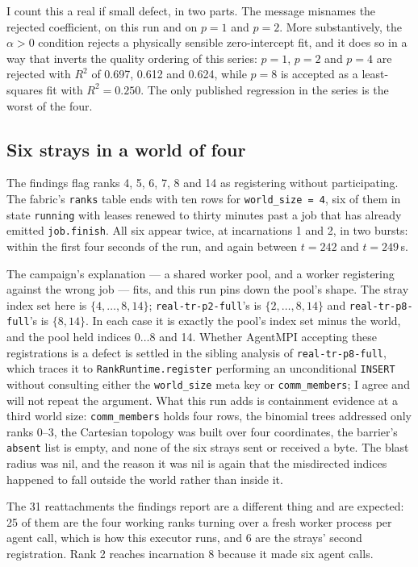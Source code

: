 \documentclass[11pt]{article}
\begin{document}
I count this a real if small defect, in two parts. The message misnames the rejected coefficient,
on this run and on $p=1$ and $p=2$. More substantively, the $\alpha>0$ condition rejects a
physically sensible zero-intercept fit, and it does so in a way that inverts the quality ordering
of this series: $p=1$, $p=2$ and $p=4$ are rejected with $R^2$ of 0.697, 0.612 and 0.624, while
$p=8$ is accepted as a least-squares fit with $R^2=0.250$. The only published regression in the
series is the worst of the four.

\subsection*{Six strays in a world of four}

The findings flag ranks 4, 5, 6, 7, 8 and 14 as registering without participating. The fabric's
\texttt{ranks} table ends with ten rows for \texttt{world\_size = 4}, six of them in state
\texttt{running} with leases renewed to thirty minutes past a job that has already emitted
\texttt{job.finish}. All six appear twice, at incarnations 1 and 2, in two bursts: within the
first four seconds of the run, and again between $t=242$ and $t=249$\,s.

The campaign's explanation --- a shared worker pool, and a worker registering against the wrong
job --- fits, and this run pins down the pool's shape. The stray index set here is
$\{4,\ldots,8,14\}$; \texttt{real-tr-p2-full}'s is $\{2,\ldots,8,14\}$ and
\texttt{real-tr-p8-full}'s is $\{8,14\}$. In each case it is exactly the pool's index set minus
the world, and the pool held indices $0\ldots8$ and 14. Whether AgentMPI accepting these
registrations is a defect is settled in the sibling analysis of \texttt{real-tr-p8-full}, which
traces it to \texttt{RankRuntime.register} performing an unconditional \texttt{INSERT} without
consulting either the \texttt{world\_size} meta key or \texttt{comm\_members}; I agree and will
not repeat the argument. What this run adds is containment evidence at a third world size:
\texttt{comm\_members} holds four rows, the binomial trees addressed only ranks 0--3, the Cartesian
topology was built over four coordinates, the barrier's \texttt{absent} list is empty, and none of
the six strays sent or received a byte. The blast radius was nil, and the reason it was nil is
again that the misdirected indices happened to fall outside the world rather than inside it.

The 31 reattachments the findings report are a different thing and are expected: 25 of them are
the four working ranks turning over a fresh worker process per agent call, which is how this
executor runs, and 6 are the strays' second registration. Rank 2 reaches incarnation 8 because it
made six agent calls.
\end{document}
